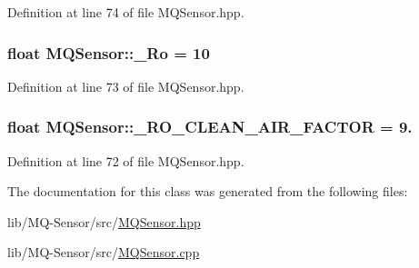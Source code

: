 Definition at line 74 of file M\+Q\+Sensor.\+hpp.

\subsubsection[{\texorpdfstring{\+\_\+\+Ro}{_Ro}}]{\setlength{\rightskip}{0pt plus 5cm}float M\+Q\+Sensor\+::\+\_\+\+Ro = 10\hspace{0.3cm}{\ttfamily [protected]}}\hypertarget{class_m_q_sensor_ade2e483ebc557d1caf753d41a8b3afde}{}\label{class_m_q_sensor_ade2e483ebc557d1caf753d41a8b3afde}


Definition at line 73 of file M\+Q\+Sensor.\+hpp.

\subsubsection[{\texorpdfstring{\+\_\+\+R\+O\+\_\+\+C\+L\+E\+A\+N\+\_\+\+A\+I\+R\+\_\+\+F\+A\+C\+T\+OR}{_RO_CLEAN_AIR_FACTOR}}]{\setlength{\rightskip}{0pt plus 5cm}float M\+Q\+Sensor\+::\+\_\+\+R\+O\+\_\+\+C\+L\+E\+A\+N\+\_\+\+A\+I\+R\+\_\+\+F\+A\+C\+T\+OR = 9.\hspace{0.3cm}{\ttfamily [protected]}}\hypertarget{class_m_q_sensor_adc7e7af2139868a784d31d27d73b7df3}{}\label{class_m_q_sensor_adc7e7af2139868a784d31d27d73b7df3}


Definition at line 72 of file M\+Q\+Sensor.\+hpp.



The documentation for this class was generated from the following files\+:\begin{DoxyCompactItemize}
\item 
lib/\+M\+Q-\/\+Sensor/src/\hyperlink{_m_q_sensor_8hpp}{M\+Q\+Sensor.\+hpp}\item 
lib/\+M\+Q-\/\+Sensor/src/\hyperlink{_m_q_sensor_8cpp}{M\+Q\+Sensor.\+cpp}\end{DoxyCompactItemize}
